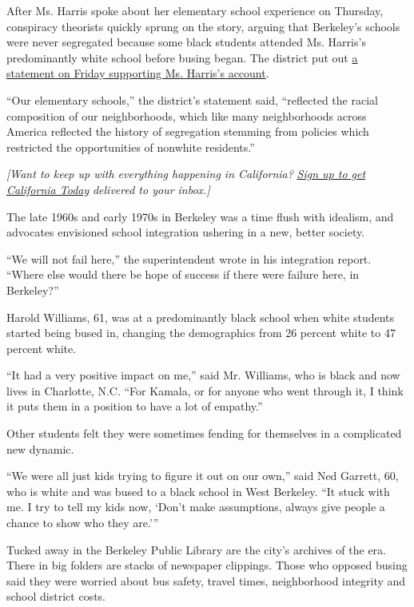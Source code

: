 After Ms. Harris spoke about her elementary school experience on
Thursday, conspiracy theorists quickly sprung on the story, arguing that
Berkeley's schools were never segregated because some black students
attended Ms. Harris's predominantly white school before busing began.
The district put out
\href{https://www.berkeleyschools.net/2019/06/the-history-of-integration-in-berkeley-elementary-schools-and-senator-harris/}{a
statement on Friday supporting Ms. Harris's account}.

``Our elementary schools,'' the district's statement said, ``reflected
the racial composition of our neighborhoods, which like many
neighborhoods across America reflected the history of segregation
stemming from policies which restricted the opportunities of nonwhite
residents.''

\emph{{[}Want to keep up with everything happening in California?}
\href{https://www.nytimes3xbfgragh.onion/newsletters/california-today}{\emph{Sign
up to get California Today}} \emph{delivered to your inbox.{]}}

The late 1960s and early 1970s in Berkeley was a time flush with
idealism, and advocates envisioned school integration ushering in a new,
better society.

``We will not fail here,'' the superintendent wrote in his integration
report. ``Where else would there be hope of success if there were
failure here, in Berkeley?''

Harold Williams, 61, was at a predominantly black school when white
students started being bused in, changing the demographics from 26
percent white to 47 percent white.

``It had a very positive impact on me,'' said Mr. Williams, who is black
and now lives in Charlotte, N.C. ``For Kamala, or for anyone who went
through it, I think it puts them in a position to have a lot of
empathy.''

Other students felt they were sometimes fending for themselves in a
complicated new dynamic.

``We were all just kids trying to figure it out on our own,'' said Ned
Garrett, 60, who is white and was bused to a black school in West
Berkeley. ``It stuck with me. I try to tell my kids now, `Don't make
assumptions, always give people a chance to show who they are.'''

Tucked away in the Berkeley Public Library are the city's archives of
the era. There in big folders are stacks of newspaper clippings. Those
who opposed busing said they were worried about bus safety, travel
times, neighborhood integrity and school district costs.

